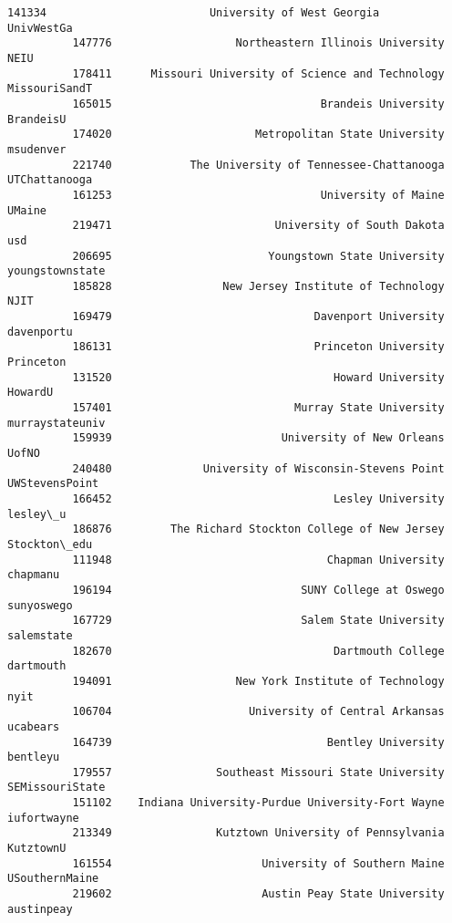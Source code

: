 \documentclass[11pt]{article}
\begin{document}
\begin{Verbatim}[commandchars=\\\{\}]
          141334                         University of West Georgia       UnivWestGa   
          147776                   Northeastern Illinois University             NEIU   
          178411      Missouri University of Science and Technology    MissouriSandT   
          165015                                Brandeis University        BrandeisU   
          174020                      Metropolitan State University        msudenver   
          221740            The University of Tennessee-Chattanooga    UTChattanooga   
          161253                                University of Maine           UMaine   
          219471                         University of South Dakota              usd   
          206695                        Youngstown State University  youngstownstate   
          185828                 New Jersey Institute of Technology             NJIT   
          169479                               Davenport University       davenportu   
          186131                               Princeton University        Princeton   
          131520                                  Howard University          HowardU   
          157401                            Murray State University  murraystateuniv   
          159939                          University of New Orleans            UofNO   
          240480              University of Wisconsin-Stevens Point   UWStevensPoint   
          166452                                  Lesley University         lesley\_u   
          186876         The Richard Stockton College of New Jersey     Stockton\_edu   
          111948                                 Chapman University         chapmanu   
          196194                             SUNY College at Oswego       sunyoswego   
          167729                             Salem State University       salemstate   
          182670                                  Dartmouth College        dartmouth   
          194091                   New York Institute of Technology             nyit   
          106704                     University of Central Arkansas         ucabears   
          164739                                 Bentley University         bentleyu   
          179557                Southeast Missouri State University  SEMissouriState   
          151102    Indiana University-Purdue University-Fort Wayne      iufortwayne   
          213349                Kutztown University of Pennsylvania        KutztownU   
          161554                       University of Southern Maine   USouthernMaine   
          219602                       Austin Peay State University       austinpeay   

\end{Verbatim}
\end{document}
